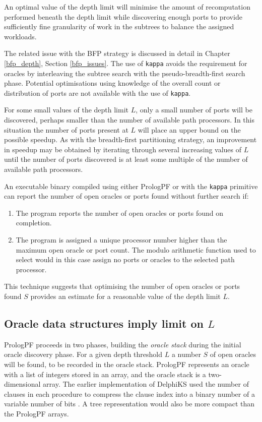 An optimal value of the depth limit will minimise the amount of recomputation
performed beneath the depth limit while discovering enough ports to provide sufficiently
fine granularity of work in the subtrees to balance the assigned workloads.

The related issue with the BFP strategy is discussed in detail in Chapter \ref{bfp_depth},
Section \ref{bfp_issues}.  The use of \texttt{kappa} avoids the requirement for
oracles by interleaving the subtree search with the pseudo-breadth-first search phase.
Potential optimisations using knowledge of the overall count or distribution of ports
are not available with the use of \texttt{kappa}.

For some small values of the depth limit $L$,  only a small number of ports will
be discovered, perhaps smaller than the number of available path processors.  In
this situation the number of ports present at $L$ will place an upper bound on the
possible speedup.  As with the breadth-first partitioning strategy, an improvement
in speedup may be obtained by iterating through several increasing values of $L$
until the number of ports discovered is at least some multiple of the number of
available path processors.

An executable binary compiled using either PrologPF or with the \texttt{kappa}
primitive can report the number of open oracles or ports found without further
search if:\\
\begin{enumerate}
\item{The program reports the number of open oracles or ports found on completion.}
\item{The program is assigned a unique processor number higher than the maximum
  open oracle or port count.  The modulo arithmetic function used to select would
  in this case assign no ports or oracles to the selected path processor.}
\end{enumerate}
This technique suggests that optimising the number of open oracles or
ports found $S$ provides an estimate for a reasonable value of the depth
limit $L$.

\subsection{Oracle data structures imply limit on $L$}

PrologPF proceeds in two phases, building the \textit{oracle stack} during the
initial oracle discovery phase.  For a given depth threshold $L$ a number $S$ of
open oracles will be found, to be recorded in the oracle stack.  PrologPF represents
an oracle with a list of integers stored in an array, and the oracle stack is a
two-dimensional array.  The earlier implementation of DelphiKS used the number of
clauses in each procedure to compress the clause index into a binary number of
a variable number of bits \cite{Kle91}.  A tree representation would also be
more compact than the PrologPF arrays.

